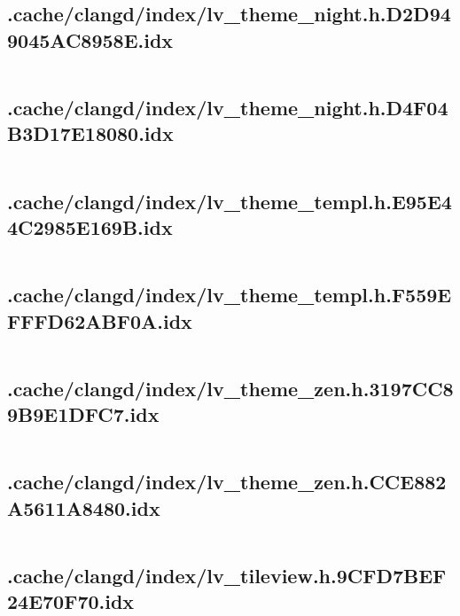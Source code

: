 \subsection{.cache/clangd/index/lv_theme_night.h.D2D949045AC8958E.idx}
\inputminted[linenos,tabsize=2,breaklines, breakanywhere]{c}{lv_theme_night.h.D2D949045AC8958E.idx}
\pagebreak

\subsection{.cache/clangd/index/lv_theme_night.h.D4F04B3D17E18080.idx}
\inputminted[linenos,tabsize=2,breaklines, breakanywhere]{c}{lv_theme_night.h.D4F04B3D17E18080.idx}
\pagebreak

\subsection{.cache/clangd/index/lv_theme_templ.h.E95E44C2985E169B.idx}
\inputminted[linenos,tabsize=2,breaklines, breakanywhere]{c}{lv_theme_templ.h.E95E44C2985E169B.idx}
\pagebreak

\subsection{.cache/clangd/index/lv_theme_templ.h.F559EFFFD62ABF0A.idx}
\inputminted[linenos,tabsize=2,breaklines, breakanywhere]{c}{lv_theme_templ.h.F559EFFFD62ABF0A.idx}
\pagebreak

\subsection{.cache/clangd/index/lv_theme_zen.h.3197CC89B9E1DFC7.idx}
\inputminted[linenos,tabsize=2,breaklines, breakanywhere]{c}{lv_theme_zen.h.3197CC89B9E1DFC7.idx}
\pagebreak

\subsection{.cache/clangd/index/lv_theme_zen.h.CCE882A5611A8480.idx}
\inputminted[linenos,tabsize=2,breaklines, breakanywhere]{c}{lv_theme_zen.h.CCE882A5611A8480.idx}
\pagebreak

\subsection{.cache/clangd/index/lv_tileview.h.9CFD7BEF24E70F70.idx}
\inputminted[linenos,tabsize=2,breaklines, breakanywhere]{c}{lv_tileview.h.9CFD7BEF24E70F70.idx}
\pagebreak


